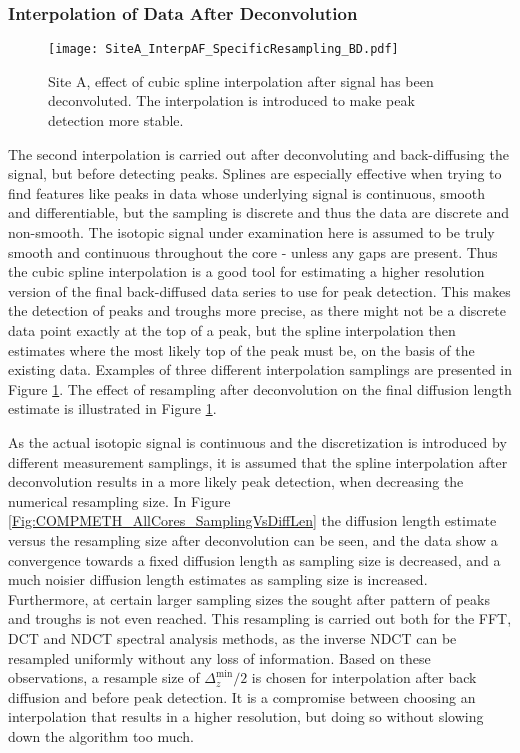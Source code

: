 \documentclass[../../CompleteThesis2/Complete_2ndDraft]{subfiles}
\begin{document}
\subsubsection[Interpolation 2]{Interpolation of Data After Deconvolution}
\label{Subsubsec:METH_Interpolation_AFdecon}
\begin{figure}[!htb]
	\centering
	\texttt{[image: SiteA\_InterpAF\_SpecificResampling\_BD.pdf]}
	\caption[BD data, Site A, resamplings after deconvolution]{\small Site A, effect of cubic spline interpolation after signal has been deconvoluted. The interpolation is introduced to make peak detection more stable.}
	\label{Fig:COMPMETH_SiteA_InterpAF_4samplings}
\end{figure}

The second interpolation is carried out after deconvoluting and back-diffusing the signal, but before detecting peaks. Splines are especially effective when trying to find features like peaks in data whose underlying signal is continuous, smooth and differentiable, but the sampling is discrete and thus the data are discrete and non-smooth. The isotopic signal under examination here is assumed to be truly smooth and continuous throughout the core - unless any gaps are present. Thus the cubic spline interpolation is a good tool for estimating a higher resolution version of the final back-diffused data series to use for peak detection. This makes the detection of peaks and troughs more precise, as there might not be a discrete data point exactly at the top of a peak, but the spline interpolation then estimates where the most likely top of the peak must be, on the basis of the existing data. Examples of three different interpolation samplings are presented in Figure \ref{Fig:COMPMETH_SiteA_InterpAF_4samplings}. The effect of resampling after deconvolution on the final diffusion length estimate is illustrated in Figure \ref{Fig:COMPMETH_SiteA_InterpAF_4samplings}. 

As the actual isotopic signal is continuous and the discretization is introduced by different measurement samplings, it is assumed that the spline interpolation after deconvolution results in a more likely peak detection, when decreasing the numerical resampling size. In Figure \ref{Fig:COMPMETH_AllCores_SamplingVsDiffLen} the diffusion length estimate versus the resampling size after deconvolution can be seen, and the data show a convergence towards a fixed diffusion length as sampling size is decreased, and a much noisier diffusion length estimates as sampling size is increased. Furthermore, at certain larger sampling sizes the sought after pattern of peaks and troughs is not even reached. This resampling is carried out both for the FFT, DCT and NDCT spectral analysis methods, as the inverse NDCT can be resampled uniformly without any loss of information. Based on these observations, a resample size of $\Delta_z^{\text{min}}/2$ is chosen for interpolation after back diffusion and before peak detection. It is a compromise between choosing an interpolation that results in a higher resolution, but doing so without slowing down the algorithm too much. 
\end{document}
